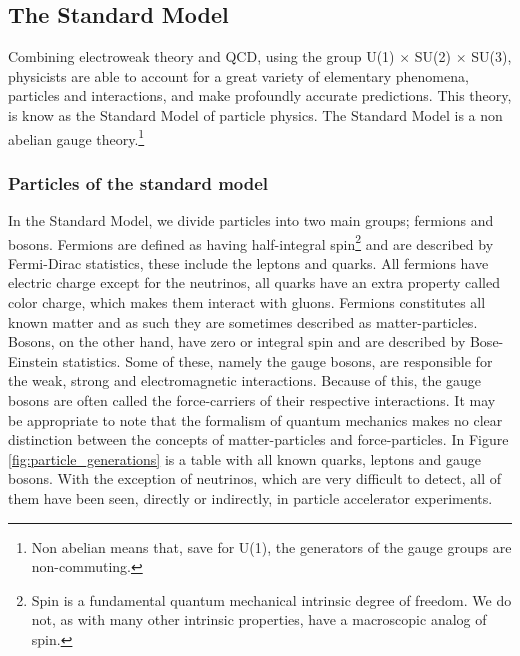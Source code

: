 \subsection{The Standard Model}
Combining electroweak theory and QCD, using the group U(1) $\times$ SU(2) $\times$ SU(3), physicists are able to account for a great variety of elementary phenomena, particles and interactions, and make profoundly accurate predictions. This theory, is know as the Standard Model of particle physics. The Standard Model is a non abelian gauge theory.\footnote{Non abelian means that, save for U(1), the generators of the gauge groups are non-commuting.}

\subsubsection{Particles of the standard model} \label{sec:particles}


In the Standard Model, we divide particles into two main groups; fermions and bosons. Fermions are defined as having half-integral spin\footnote{Spin is a fundamental quantum mechanical intrinsic degree of freedom. We do not, as with many other intrinsic properties, have a macroscopic analog of spin.} and are described by Fermi-Dirac statistics, these include the leptons and quarks. All fermions have electric charge except for the neutrinos, all quarks have an extra property called color charge, which makes them interact with gluons. Fermions constitutes all known matter and as such they are sometimes described as matter-particles. Bosons, on the other hand, have zero or integral spin and are described by Bose-Einstein statistics. Some of these, namely the gauge bosons, are responsible for the weak, strong and electromagnetic interactions. Because of this, the gauge bosons are often called the force-carriers of their respective interactions. It may be appropriate to note that the formalism of quantum mechanics makes no clear distinction between the concepts of matter-particles and force-particles. In Figure \ref{fig:particle_generations} is a table with all known quarks, leptons and gauge bosons. With the exception of neutrinos, which are very difficult to detect, all of them have been seen, directly or indirectly, in particle accelerator experiments.

